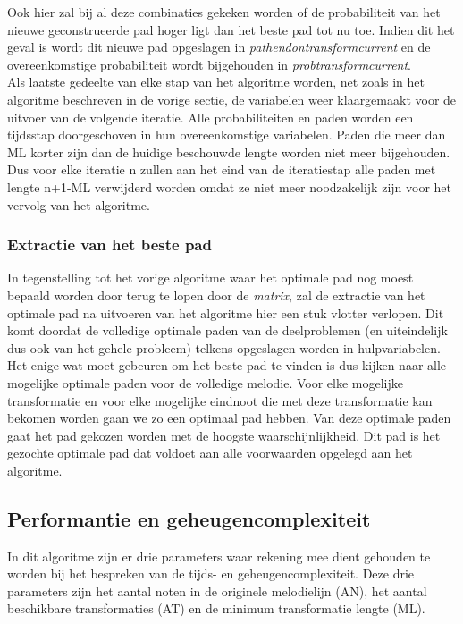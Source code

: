 Ook hier zal bij al deze combinaties gekeken worden of de probabiliteit van het nieuwe geconstrueerde pad hoger ligt dan het beste pad tot nu toe. Indien dit het geval is wordt dit nieuwe pad opgeslagen in \textit{path\textunderscore end\textunderscore on\textunderscore transform\textunderscore current} en de overeenkomstige probabiliteit wordt bijgehouden in \textit{prob\textunderscore transform\textunderscore current}.\\
Als laatste gedeelte van elke stap van het algoritme worden, net zoals in het algoritme beschreven in de vorige sectie, de variabelen weer klaargemaakt voor de uitvoer van de volgende iteratie. Alle probabiliteiten en paden worden een tijdsstap doorgeschoven in hun overeenkomstige variabelen. Paden die meer dan ML korter zijn dan de huidige beschouwde lengte worden niet meer bijgehouden. Dus voor elke iteratie n zullen aan het eind van de iteratiestap alle paden met lengte n+1-ML verwijderd worden omdat ze niet meer noodzakelijk zijn voor het vervolg van het algoritme.

\subsubsection{Extractie van het beste pad}
In tegenstelling tot het vorige algoritme waar het optimale pad nog moest bepaald worden door terug te lopen door de \textit{matrix}, zal de extractie van het optimale pad na uitvoeren van het algoritme hier een stuk vlotter verlopen. Dit komt doordat de volledige optimale paden van de deelproblemen (en uiteindelijk dus ook van het gehele probleem) telkens opgeslagen worden in hulpvariabelen.\\ 
Het enige wat moet gebeuren om het beste pad te vinden is dus kijken naar alle mogelijke optimale paden voor de volledige melodie. Voor elke mogelijke transformatie en voor elke mogelijke eindnoot die met deze transformatie kan bekomen worden gaan we zo een optimaal pad hebben. Van deze optimale paden gaat het pad gekozen worden met de hoogste waarschijnlijkheid. Dit pad is het gezochte optimale pad dat voldoet aan alle voorwaarden opgelegd aan het algoritme.

\subsection{Performantie en geheugencomplexiteit}
In dit algoritme zijn er drie parameters waar rekening mee dient gehouden te worden bij het bespreken van de tijds- en geheugencomplexiteit. Deze drie parameters zijn het aantal noten in de originele melodielijn (AN), het aantal beschikbare transformaties (AT) en de minimum transformatie lengte (ML).

